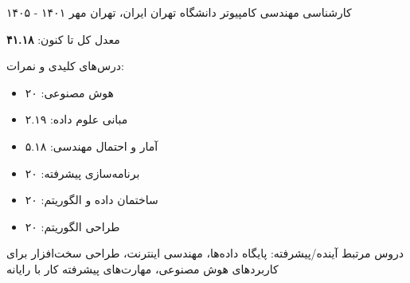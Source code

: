 

\begin{cventries}

  \cventry
    {کارشناسی مهندسی کامپیوتر} %
    {دانشگاه تهران} %
    {ایران، تهران} %
    {مهر ۱۴۰۱ - ۱۴۰۵} %
    {
      \begin{cvitems} %
        \item {معدل کل تا کنون: \textbf{۴۱.۱۸}}
        \item {درس‌های کلیدی و نمرات:}
        \begin{itemize}
          \item هوش مصنوعی: ۲۰
          \item مبانی علوم داده: ۲.۱۹
          \item آمار و احتمال مهندسی: ۵.۱۸
          \item برنامه‌سازی پیشرفته: ۲۰
          \item ساختمان داده و الگوریتم: ۲۰
          \item طراحی الگوریتم: ۲۰
        \end{itemize}
        \item {دروس مرتبط آینده/پیشرفته: پایگاه داده‌ها، مهندسی اینترنت، طراحی سخت‌افزار برای کاربردهای هوش مصنوعی، مهارت‌های پیشرفته کار با رایانه}
      \end{cvitems}
    }
\end{cventries}
